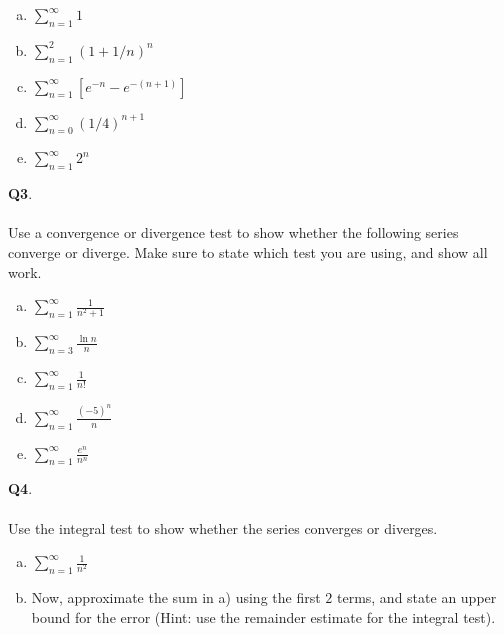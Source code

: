 \documentclass[12pt, oneside]{amsart}
\begin{document}
\begin{enumerate}[a)]
  \item
    $\displaystyle{\sum_{n=1}^{\infty} 1}$
    \vspace{6cm}
  \item
    $\displaystyle{\sum_{n=1}^{2} (1 + 1/n)^{n}}$
\vspace{6cm}
\item
  $\sum_{n=1}^{\infty} [e^{-n} - e^{-(n+1)}]$
  \newpage
   \item
     $\sum_{n=0}^{\infty} \displaystyle{(1/4)^{n+1}}$
     \vspace{9cm}
   \item $\sum_{n=1}^{\infty} \displaystyle{2^{n}}$
  \vspace{6cm}
\end{enumerate}
\newpage
\noindent
\textbf{Q3}. \\ \\ Use a convergence or divergence test to show whether the following series converge or diverge. Make sure to state which test you are using, and show all work. \\
\begin{enumerate}[a)]
  \item
$\displaystyle{\sum_{n=1}^{\infty} \frac{1}{n^{2} + 1}}$
    \vspace{6cm}
  \item
$\displaystyle{\sum_{n=3}^{\infty} \frac{\ln n}{n}}$
\vspace{6cm}
\item
  $ \displaystyle{\sum_{n=1}^{\infty} \frac{1}{n!}}$
  \newpage
\item
  $ \displaystyle{\sum_{n=1}^{\infty} \frac{(-5)^{n}}{n} }$
  \vspace{9cm}
\item
  $ \displaystyle{\sum_{n=1}^{\infty} \frac{e^{n}}{n^{n}} }$
\end{enumerate}



\newpage
\noindent
\textbf{Q4}. \\ \\ Use the integral test to show whether the
series converges or diverges. \\
\begin{enumerate}[a)]
\item
  $ \displaystyle{\sum_{n=1}^{\infty} \frac{{1}}{n^{2}}}$
  \vspace{9cm}
\item
Now, approximate the sum in a) using the first $2$
terms, and state an upper bound for the error (Hint: use the remainder estimate
for the integral test).
  \newpage
\end{enumerate}
\end{document}
